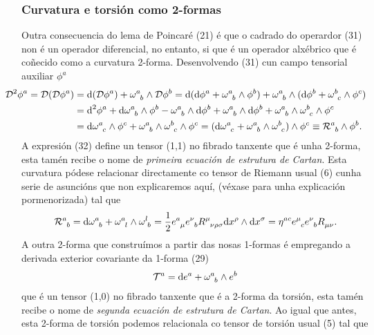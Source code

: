 \subsubsection{Curvatura e torsión como 2-formas}
Outra consecuencia do lema de Poincaré (21) é que o cadrado do operardor (31) non é un operador diferencial, no entanto, si que é un operador alxébrico que é coñecido como a curvatura 2-forma. Desenvolvendo (31) cun campo tensorial auxiliar $\phi^a$
\begin{align}
    \hspace{-2em}\nonumber\mathcal{D}^2\phi^a = \mathcal{D}(\mathcal{D}\phi^a) &= \dd(\mathcal{D}\phi^a)+\omega\indices{^a_b}\wedge\mathcal{D}\phi^b = \dd(\dd\phi^a +\omega\indices{^a_b}\wedge\phi^b) + \omega\indices{^a_b}\wedge(\dd\phi^b +\omega\indices{^b_c}\wedge\phi^c)\\
    \nonumber &= \dd^2\phi^a + \dd\omega\indices{^a_b}\wedge\phi^b - \omega\indices{^a_b}\wedge\dd\phi^b + \omega\indices{^a_b}\wedge\dd\phi^b + \omega\indices{^a_b}\wedge\omega\indices{^b_c}\wedge\phi^c\\
     &= \dd\omega\indices{^a_c}\wedge\phi^c + \omega\indices{^a_b}\wedge\omega\indices{^b_c}\wedge\phi^c = (\dd\omega\indices{^a_c} + \omega\indices{^a_b}\wedge\omega\indices{^b_c})\wedge\phi^c \equiv \mathcal{R}\indices{^a_b}\wedge\phi^b.
\end{align}
A expresión (32) define un tensor (1,1) no fibrado tanxente que é unha 2-forma, esta tamén recibe o nome de \textit{primeira ecuación de estrutura de Cartan}. Esta curvatura pódese relacionar directamente co tensor de Riemann usual (6) cunha serie de asuncións que non explicaremos aquí, %
(véxase \cite{lovelock-1989,EinsteinsVielben,clave} para unha explicación pormenorizada)
tal que
\begin{align}
    \mathcal{R}\indices{^a_b} = \dd\omega\indices{^a_b} + \omega\indices{^a_l}\wedge\omega\indices{^l_b} = \frac{1}{2}\viel\bieli R\indices{^\mu_\nu_\rho_\sigma}\dd x^\rho\wedge\dd x^\sigma = \eta\indices{^a^c}e\indices{^\mu_c}\bieli R\indices{_\mu_\nu}.
\end{align}
A outra 2-forma que construímos a partir das nosas 1-formas é empregando a derivada exterior covariante da 1-forma (29) 
\begin{align}
    \mathcal{T}^a = \dd e^a + \omega\indices{^a_b}\wedge e^b
\end{align}
que é un tensor (1,0) no fibrado tanxente que é a 2-forma da torsión, esta tamén recibe o nome de \textit{segunda ecuación de estrutura de Cartan}. Ao igual que antes, esta 2-forma de torsión podemos relacionala co tensor de torsión usual (5) tal que
